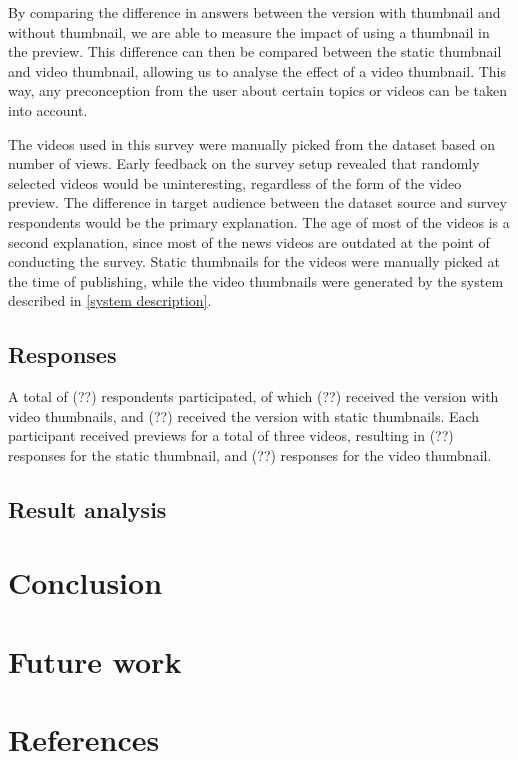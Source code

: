 \documentclass{../resources/acm_proc_article-sp}
\begin{document}
By comparing the difference in answers between the version with thumbnail and without thumbnail, we are able to measure the impact of using a thumbnail in the preview. This difference can then be compared between the static thumbnail and video thumbnail, allowing us to analyse the effect of a video thumbnail. This way, any preconception from the user about certain topics or videos can be taken into account.

The videos used in this survey were manually picked from the dataset based on number of views. Early feedback on the survey setup revealed that randomly selected videos would be uninteresting, regardless of the form of the video preview. The difference in target audience between the dataset source and survey respondents would be the primary explanation. The age of most of the videos is a second explanation, since most of the news videos are outdated at the point of conducting the survey. Static thumbnails for the videos were manually picked at the time of publishing, while the video thumbnails were generated by the system described in \ref{system description}.

\subsection{Responses}

A total of (??) respondents participated, of which (??) received the version with video thumbnails, and (??) received the version with static thumbnails. Each participant received previews for a total of three videos, resulting in (??) responses for the static thumbnail, and (??) responses for the video thumbnail.

\subsection{Result analysis}


\section{Conclusion}

\section{Future work}

\section{References}
\end{document}
